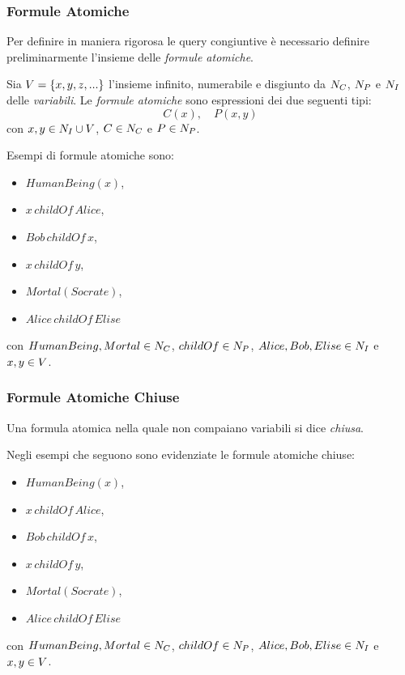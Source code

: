 \documentclass[8pt]{beamer}
\begin{document}
\begin{frame}
\frametitle{Formule Atomiche}

Per definire in maniera rigorosa le query congiuntive \`e necessario
definire preliminarmente l'insieme delle \emph{formule atomiche}. 
\vspace{\baselineskip}

Sia $V = \{x, y, z, ... \}$ l'insieme infinito, numerabile 
e disgiunto da $N_C$, $N_P$ e $N_I$ delle \emph{variabili}.
Le \emph{formule atomiche} sono espressioni dei due seguenti tipi:
\[
 C(x), \quad P(x, y)
\]
con $x, y \in N_I \cup V$, $C \in N_C$ e $P \in N_P$.
\vspace{\baselineskip}

Esempi di formule atomiche sono:
\begin{itemize}
 \item $HumanBeing(x)$,
 \item $x\,childOf\,Alice$,
 \item $Bob\,childOf\,x$,
 \item $x\,childOf\,y$,
 \item $Mortal(Socrate)$,
 \item $Alice\,childOf\,Elise$
\end{itemize}
con $HumanBeing, Mortal \in N_C$, $childOf \in N_P$, 
$Alice, Bob, Elise \in N_I$ e $x, y \in V$.
\end{frame}

\begin{frame}
\frametitle{Formule Atomiche Chiuse}
Una formula atomica nella quale non compaiano variabili si dice \emph{chiusa}.
\vspace{\baselineskip}

Negli esempi che seguono sono evidenziate le formule atomiche chiuse:
\begin{itemize}
 \item $HumanBeing(x)$,
 \item $x\,childOf\,Alice$,
 \item $Bob\,childOf\,x$,
 \item $x\,childOf\,y$,
 \item $Mortal(Socrate)$,
 \item $Alice\,childOf\,Elise$
\end{itemize}
con $HumanBeing, Mortal \in N_C$, $childOf \in N_P$, 
$Alice, Bob, Elise \in N_I$ e $x, y \in V$.
\vspace{\baselineskip}

\phantom{Le asserzioni presenti nelle ontologie sono formule atomiche chiuse.}
\end{frame}
\end{document}
